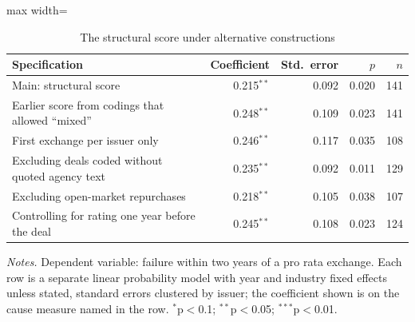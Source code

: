 \begin{table}[H]
\centering
\caption{The structural score under alternative constructions}
\label{tab:robust}
\small
\begin{adjustbox}{max width=\textwidth}
\begin{tabular}{l r r r r}
\toprule
Specification & Coefficient & Std.\ error & $p$ & $n$ \\
\midrule
Main: structural score & 0.215$^{**}$ & 0.092 & 0.020 & 141 \\
\addlinespace
Earlier score from codings that allowed ``mixed'' & 0.248$^{**}$ & 0.109 & 0.023 & 141 \\
\addlinespace
First exchange per issuer only & 0.246$^{**}$ & 0.117 & 0.035 & 108 \\
Excluding deals coded without quoted agency text & 0.235$^{**}$ & 0.092 & 0.011 & 129 \\
Excluding open-market repurchases & 0.218$^{**}$ & 0.105 & 0.038 & 107 \\
Controlling for rating one year before the deal & 0.245$^{**}$ & 0.108 & 0.023 & 124 \\
\bottomrule
\end{tabular}
\end{adjustbox}
\begin{minipage}{0.95\textwidth}\vspace{4pt}\footnotesize
\textit{Notes.} Dependent variable: failure within two years of a pro rata exchange. Each row is a separate linear probability model with year and industry fixed effects unless stated, standard errors clustered by issuer; the coefficient shown is on the cause measure named in the row. $^{*}$p$<$0.1; $^{**}$p$<$0.05; $^{***}$p$<$0.01.
\end{minipage}
\end{table}
